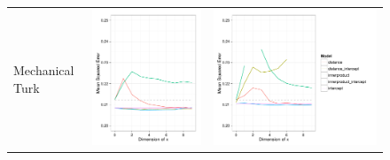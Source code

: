 \begin{figure}
\begin{tabular}{m{2cm}cc}
  \tiny{Mechanical Turk} & \includegraphics[height=0.2\textheight]{chapter_foreign_relations/figures/010_static_model_results.pdf} & \includegraphics[height=0.2\textheight]{chapter_foreign_relations/figures/010_dynamic_model_results.pdf}

\end{tabular}
\end{figure}
